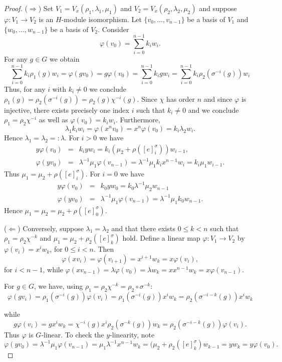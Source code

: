 \documentclass[10pt,a4paper]{amsart}
\newcommand{\wind}[2]{[#1]_{#2}^{\sigma}}
\begin{document}
\begin{proof}
($\Rightarrow$) 
Set $V_1=V_x(\rho_1, \lambda_1,\mu_1)$ and $V_2=V_x (\rho_2, \lambda_2,\mu_2)$ and suppose  $\varphi:V_1\to V_2$ is an $H$-module isomorphism. Let $\{v_0,\ldots, v_{n-1}\}$ be a basis of $V_1$ and $\{w_0, \ldots, w_{n-1}\}$ be a basis of $V_2$. Consider 
%
\[
\varphi(v_0) = \sum_{i=0}^{n-1} k_i w_i.
\]
%
For any $g\in G$ we obtain
%
\[
\sum_{i=0}^{n-1} k_i \rho_1(g) w_i = \varphi(gv_0) = g\varphi(v_0) = \sum_{i=0}^{n-1} k_i gw_i 
= \sum_{i=0}^{n-1} k_i \rho_2(\sigma^{-i}(g)) w_i 
\]
%
Thus, for any $i$ with $k_i\neq 0$ we conclude $\rho_1(g) = \rho_2(\sigma^{-i}(g)) = \rho_2(g)\chi^{-i}(g)$. Since $\chi$ has order $n$ and since $\varphi$ is injective, there exists precisely one index $i$ such that $k_i\neq 0$ and we conclude $\rho_1 = \rho_2 \chi^{-i}$ as well as $\varphi(v_0)= k_i w_i$. Furthermore, 
%
\[ \lambda_1 k_i w_i = \varphi(x^n v_0) = x^n \varphi(v_0) =k_i \lambda_2 w_i.\]
%
Hence $\lambda_1=\lambda_2 =: \lambda $.  For $i>0$ we have 
%
\begin{eqnarray*}
 y\varphi(v_0) &=& k_i yw_i = k_i (\mu_2 + \rho(\wind{e}{i}))w_{i-1},\\
 \varphi(yv_0) &=& \lambda^{-1}\mu_1 \varphi(v_{n-1})  = \lambda^{-1}\mu_1 k_i x^{n-1} w_i   = k_i \mu_1 w_{i-1} .
 \end{eqnarray*}
%
Thus $\mu_1 = \mu_2 + \rho(\wind{e}{i})$. For $i=0$ we have 
%
\begin{eqnarray*}
 y\varphi(v_0) &=& k_0 y w_0 = k_0\lambda^{-1}\mu_2 w_{n-1} \\
 \varphi(yv_0) &=& \lambda^{-1}\mu_1 \varphi(v_{n-1})  = \lambda^{-1}\mu_1 k_0 w_{n-1}.
 \end{eqnarray*}
Hence $\mu_1 = \mu_2 = \mu_2 + \rho(\wind{e}{0})$.

($\Leftarrow$) Conversely, suppose $\lambda_1=\lambda_2$ and that there exists $0\leq k < n$ such that  $\rho_1=\rho_2\chi^{-k} $ and $\mu_1 = \mu_2 + \rho_2(\wind{e}{k})$ hold. 
Define a linear map $\varphi: V_1 \to V_2$ by $\varphi(v_{i}) = x^i w_k$, for $0\leq i<n$. Then
\[ \varphi(xv_i) = \varphi(v_{i+1}) = x^{i+1}w_k = x \varphi(v_i),\]  for $i<n-1$,  while  $\varphi(xv_{n-1})=\lambda \varphi(v_0)= \lambda w_k = x x^{n-1} w_k= x\varphi(v_{n-1}).$

For  $g \in G$, we have, using $\rho_1 = \rho_2 \chi^{-k} = \rho_2\circ \sigma^{-k}$:
%
\[\varphi(g v_{i}) = \rho_1 (\sigma^{-i}(g)) \varphi(v_{i}) = \rho_1 (\sigma^{-i}(g)) x^iw_k = \rho_2 (\sigma^{-i-k}(g)) x^iw_k\]

%
while
%
\[g \varphi(v_{i}) = g x^i w_k = \chi^{-i}(g) x^i \rho_2(\sigma^{-k}(g)) w_k  =\rho_2(\sigma^{-i-k}(g)) \varphi(v_i).\]
%
Thus $\varphi$ is $G$-linear. To check the $y$-linearity, note
%
\[
\varphi(yv_0)=\lambda^{-1}\mu_1\varphi(v_{n-1})
=\mu_1\lambda^{-1}x^{n-1}w_k 
=(\mu_2 + \rho_2(\wind{e}{k})w_{k-1} = y w_k = y\varphi(v_0).
\]
%



\end{proof}
\end{document}
